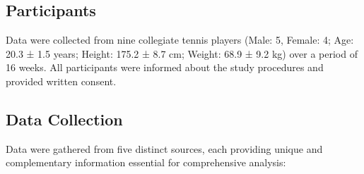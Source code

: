 \documentclass[manuscript,acmsmall,review,screen,authorversion=true]{acmart}
\begin{document}
\subsection{Participants}

Data were collected from nine collegiate tennis players (Male: 5, Female: 4; Age: 20.3 ± 1.5 years; Height: 175.2 ± 8.7 cm; Weight: 68.9 ± 9.2 kg) over a period of 16 weeks. All participants were informed about the study procedures and provided written consent.

\subsection{Data Collection}

Data were gathered from five distinct sources, each providing unique and complementary information essential for comprehensive analysis:
\end{document}
